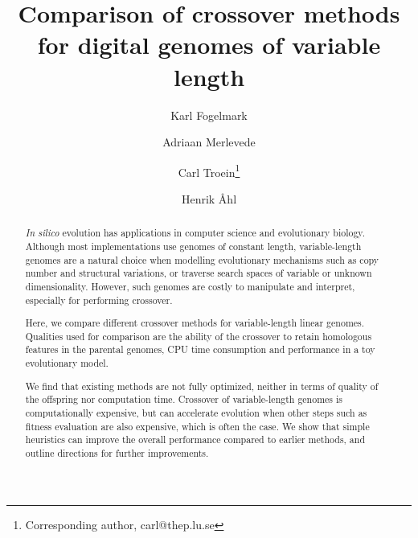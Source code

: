 \documentclass[10pt]{article}
\date{}
\title{Comparison of crossover methods for digital genomes of variable length}
\author[1]{Karl Fogelmark}
\author[1]{Adriaan Merlevede}
\author[1]{Carl Troein\footnote{Corresponding author, carl@thep.lu.se}}
\author[1]{Henrik \r{A}hl}
\affil[1]{Computational Biology and Biological Physics, Department of Astronomy and Theoretical Physics, Lund University, 223 62 Lund, Sweden}
\begin{document}
\maketitle



\begin{abstract}


\textit{In silico} evolution has applications in computer science and
evolutionary biology. Although most implementations use genomes of constant
length, variable-length genomes are a natural choice when modelling
evolutionary mechanisms such as copy number and structural variations, or
traverse search spaces of variable or unknown dimensionality. However, such
genomes are costly to manipulate and interpret, especially for performing
crossover.


Here, we compare different crossover methods for variable-length linear
genomes. Qualities used for comparison are the ability of the crossover to
retain homologous features in the parental genomes, CPU time consumption and
performance in a toy evolutionary model.


We find that existing methods are not fully optimized, neither in terms of
quality of the offspring nor computation time. Crossover
of variable-length genomes is computationally expensive, but
can accelerate evolution when other steps such as fitness evaluation
are also expensive, which is often the case. We show that simple
heuristics can improve the overall performance compared to earlier
methods, and outline directions for further improvements.

\end{abstract}

\newpage


\end{document}
